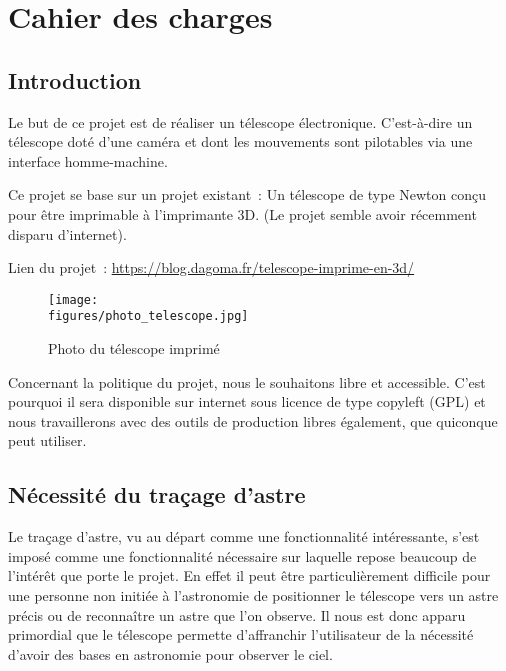 \chapter{Cahier des charges}

\section{Introduction}

Le but de ce projet est de réaliser un télescope électronique. C'est-à-dire un télescope doté d'une caméra et dont les mouvements sont pilotables via une interface homme-machine.

\vspace{1cm}

Ce projet se base sur un projet existant~: Un télescope de type Newton conçu pour être imprimable à l'imprimante 3D. (Le projet semble avoir récemment disparu d'internet).

Lien du projet~: \url{https://blog.dagoma.fr/telescope-imprime-en-3d/}

\begin{figure}[H]
	\centering
    \texttt{[image: \\figures/photo\_telescope.jpg]}
    \decoRule
    \caption[
    Photo du télescope imprimé]{
    Photo du télescope imprimé}
    \label{fig:Photo du télescope imprimé}
	\end{figure}

\vspace{1cm}

Concernant la politique du projet, nous le souhaitons libre et accessible. C'est pourquoi il sera disponible sur internet sous licence de type copyleft (GPL) et nous travaillerons avec des outils de production libres également, que quiconque peut utiliser.

\section{Nécessité du traçage d'astre}

Le traçage d'astre, vu au départ comme une fonctionnalité intéressante, s'est imposé comme une fonctionnalité nécessaire sur laquelle repose beaucoup de l'intérêt que porte le projet. En effet il peut être particulièrement difficile pour une personne non initiée à l'astronomie de positionner le télescope vers un astre précis ou de reconnaître un astre que l'on observe. Il nous est donc apparu primordial que le télescope permette d'affranchir l'utilisateur de la nécessité d'avoir des bases en astronomie pour observer le ciel.

